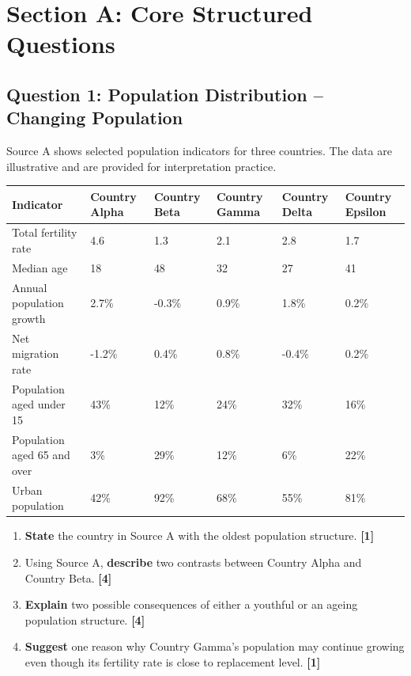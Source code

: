 \documentclass[11pt,a4paper]{article}
\newcommand{\exam}[1]{\textcolor{AccentTeal}{\textbf{#1}}}
\newcommand{\markpts}[1]{\hfill\textbf{[#1]}}
\begin{document}
\newpage

\section{Section A: Core Structured Questions}

\subsection{Question 1: Population Distribution -- Changing Population}

Source A shows selected population indicators for three countries. The data are
illustrative and are provided for interpretation practice.

\begin{tabularx}{\textwidth}{L{0.24\textwidth}C{0.105\textwidth}C{0.105\textwidth}C{0.105\textwidth}C{0.105\textwidth}C{0.105\textwidth}}
\toprule
\textbf{Indicator} & \textbf{Country Alpha} & \textbf{Country Beta} &
\textbf{Country Gamma} & \textbf{Country Delta} & \textbf{Country Epsilon} \\
\midrule
Total fertility rate & 4.6 & 1.3 & 2.1 & 2.8 & 1.7 \\
Median age & 18 & 48 & 32 & 27 & 41 \\
Annual population growth & 2.7\% & -0.3\% & 0.9\% & 1.8\% & 0.2\% \\
Net migration rate & -1.2\% & 0.4\% & 0.8\% & -0.4\% & 0.2\% \\
Population aged under 15 & 43\% & 12\% & 24\% & 32\% & 16\% \\
Population aged 65 and over & 3\% & 29\% & 12\% & 6\% & 22\% \\
Urban population & 42\% & 92\% & 68\% & 55\% & 81\% \\
\bottomrule
\end{tabularx}

\begin{enumerate}[label=\textbf{1(\alph*)}]
  \item \exam{State} the country in Source A with the oldest population
  structure. \markpts{1}

  \item Using Source A, \exam{describe} two contrasts between Country Alpha and
  Country Beta. \markpts{4}

  \item \exam{Explain} two possible consequences of either a youthful or an
  ageing population structure. \markpts{4}

  \item \exam{Suggest} one reason why Country Gamma's population may continue
  growing even though its fertility rate is close to replacement level.
  \markpts{1}
\end{enumerate}
\end{document}
